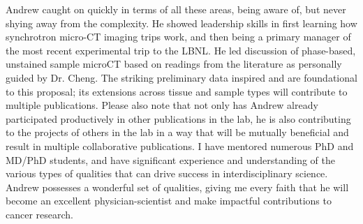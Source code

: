 \documentclass{NIHGrant}
\begin{document}
Andrew caught on quickly in terms of all these areas, being aware of, but never shying away from the complexity.  He showed leadership skills in first learning how synchrotron micro-CT imaging trips work, and then being a primary manager of the most recent experimental trip to the LBNL. He led discussion of phase-based, unstained sample microCT based on readings from the literature as personally guided by Dr. Cheng. The striking preliminary data inspired and are foundational to this proposal; its extensions across tissue and sample types will contribute to multiple publications. Please also note that not only has Andrew already participated productively in other publications in the lab, he is also contributing to the projects of others in the lab in a way that will be mutually beneficial and result in multiple collaborative publications. I have mentored numerous PhD and MD/PhD students, and have significant experience and understanding of the various types of qualities that can drive success in interdisciplinary science. Andrew possesses a wonderful set of qualities, giving me every faith that he will become an excellent physician-scientist and make impactful contributions to cancer research. 
\end{document}
